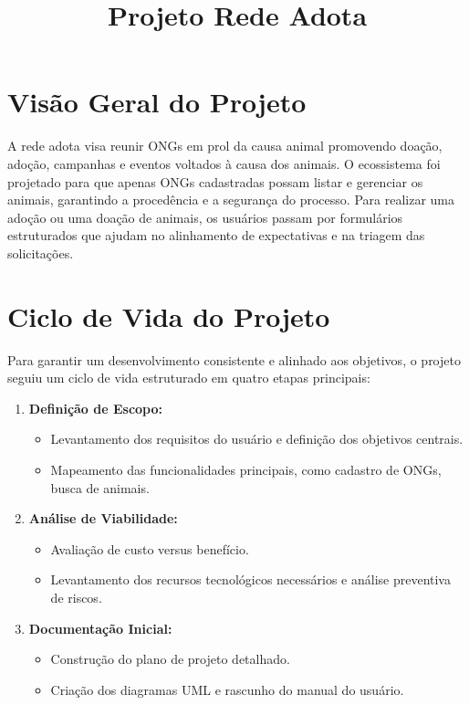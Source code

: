 \documentclass[12pt,a4paper]{article}
\title{\textbf{Projeto Rede Adota}}
\author{}
\date{}
\begin{document}
\maketitle
\vspace{-1.5cm}

\section{Visão Geral do Projeto}
A rede adota visa reunir ONGs em prol da causa animal promovendo doação, adoção, campanhas e eventos voltados à causa dos animais. O ecossistema foi projetado para que apenas ONGs cadastradas possam listar e gerenciar os animais, garantindo a procedência e a segurança do processo. Para realizar uma adoção ou uma doação de animais, os usuários passam por formulários estruturados que ajudam no alinhamento de expectativas e na triagem das solicitações.

\section{Ciclo de Vida do Projeto}
Para garantir um desenvolvimento consistente e alinhado aos objetivos, o projeto seguiu um ciclo de vida estruturado em quatro etapas principais:

\begin{enumerate}[leftmargin=*]
    \item \textbf{Definição de Escopo:}
    \begin{itemize}
        \item Levantamento dos requisitos do usuário e definição dos objetivos centrais.
        \item Mapeamento das funcionalidades principais, como cadastro de ONGs, busca de animais.
    \end{itemize}
    \item \textbf{Análise de Viabilidade:}
    \begin{itemize}
        \item Avaliação de custo versus benefício.
        \item Levantamento dos recursos tecnológicos necessários e análise preventiva de riscos.
    \end{itemize}
    \item \textbf{Documentação Inicial:}
    \begin{itemize}
        \item Construção do plano de projeto detalhado.
        \item Criação dos diagramas UML e rascunho do manual do usuário.
    \end{itemize}
\end{enumerate}
\end{document}
